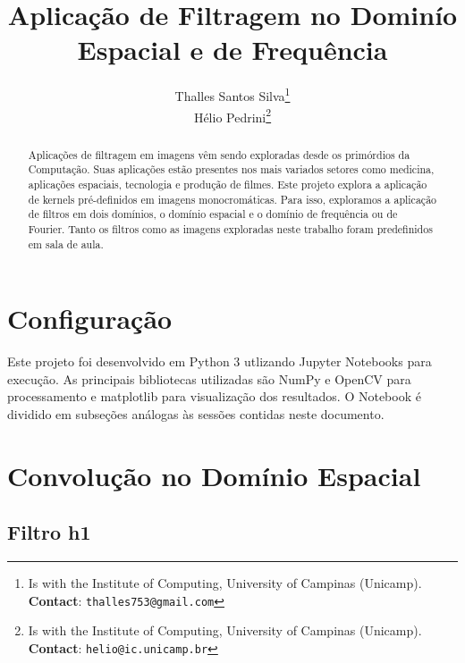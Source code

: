 \documentclass[10pt,twocolumn,letterpaper]{article}
\begin{document}
\title{Aplicação de Filtragem no Dominío Espacial e de Frequência}
\author{Thalles Santos Silva\thanks{Is with the Institute of Computing, University of Campinas (Unicamp). \textbf{Contact}: \tt\small{thalles753@gmail.com}}\\
Hélio Pedrini\thanks{Is with the Institute of Computing, University of Campinas (Unicamp). \textbf{Contact}: \tt\small{helio@ic.unicamp.br}}
}

\maketitle
\begin{abstract}
Aplicações de filtragem em imagens vêm sendo exploradas desde os primórdios da Computação. Suas aplicações estão presentes nos mais variados setores como medicina, aplicações espaciais, tecnologia e produção de filmes. Este projeto explora a aplicação de kernels pré-definidos em imagens monocromáticas. Para isso, exploramos a aplicação de filtros em dois domínios, o domínio espacial e o domínio de frequência ou de Fourier. Tanto os filtros como as imagens exploradas neste trabalho foram predefinidos em sala de aula.

\end{abstract}

\section{Configuração}

Este projeto foi desenvolvido em Python 3 utlizando Jupyter Notebooks \cite{Kluyver} para  execução. As principais bibliotecas utilizadas são NumPy \cite{NumPy} e OpenCV \cite{OpenCV} para processamento e matplotlib \cite{Matplotlib} para visualização dos resultados. O Notebook é dividido em subseções análogas às sessões contidas neste documento.

\section{Convolução no Domínio Espacial}

\subsection{Filtro h1}
\end{document}
